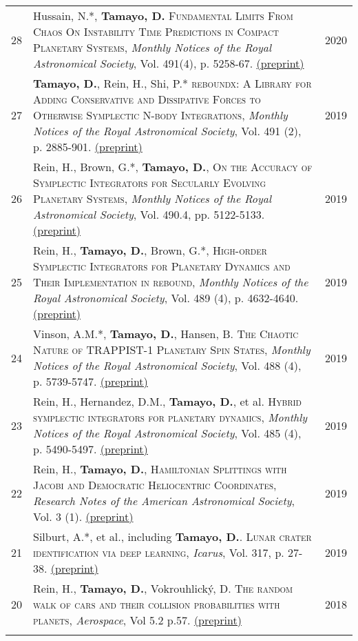 \documentclass[10pt]{article} %
\begin{document}
\begin{tabular}{>{\hfill}r|p{14.3cm}l}
28 & Hussain, N.*, {\bf Tamayo, D.} \textsc{Fundamental Limits From Chaos On Instability Time Predictions in Compact Planetary Systems}, {\it Monthly Notices of the Royal Astronomical Society}, Vol. 491(4), p. 5258-67. \href{https://www.overleaf.com/read/krtcgfjkprxz
}{(preprint)} & 2020 \\

27 & {\bf Tamayo, D.}, Rein, H., Shi, P.* \textsc{reboundx: A Library for Adding Conservative and Dissipative Forces to Otherwise Symplectic N-body Integrations}, {\it Monthly Notices of the Royal Astronomical Society}, Vol. 491 (2), p. 2885-901. \href{https://arxiv.org/abs/1908.05634}{(preprint)} & 2019 \\

26 & Rein, H., Brown, G.*, {\bf Tamayo, D.}, \textsc{On the Accuracy of Symplectic Integrators for Secularly Evolving Planetary Systems}, {\it Monthly Notices of the Royal Astronomical Society}, Vol. 490.4, pp. 5122-5133. \href{https://arxiv.org/abs/1908.03468}{(preprint)} & 2019 \\

25 & Rein, H., {\bf Tamayo, D.}, Brown, G.*, \textsc{High-order Symplectic Integrators for Planetary Dynamics and Their Implementation in rebound}, {\it Monthly Notices of the Royal Astronomical Society}, Vol. 489 (4), p. 4632-4640. \href{https://arxiv.org/abs/1907.11335}{(preprint)} & 2019 \\

24 & Vinson, A.M.*,  {\bf Tamayo, D.}, Hansen, B. \textsc{The Chaotic Nature of TRAPPIST-1 Planetary Spin States}, {\it Monthly Notices of the Royal Astronomical Society}, Vol. 488 (4), p. 5739-5747. \href{https://arxiv.org/abs/1905.11419}{(preprint)} & 2019 \\

23 & Rein, H., Hernandez, D.M., {\bf Tamayo, D.}, et al. \textsc{Hybrid symplectic integrators for planetary dynamics}, {\it Monthly Notices of the Royal Astronomical Society}, Vol. 485 (4), p. 5490-5497. \href{https://arxiv.org/abs/1903.04972}{(preprint)} & 2019 \\

22 & Rein, H., {\bf Tamayo, D.}, \textsc{Hamiltonian Splittings with Jacobi and Democratic Heliocentric Coordinates}, {\it Research Notes of the American Astronomical Society}, Vol. 3 (1). \href{https://rein.utsc.utoronto.ca/rnaas_rein_tamayo_2019.pdf}{(preprint)} & 2019 \\

21 & Silburt, A.*, et al., including {\bf Tamayo, D.}. \textsc{Lunar crater identification via deep learning}, {\it Icarus}, Vol. 317, p. 27-38. \href{https://arxiv.org/abs/1803.02192}{(preprint)} & 2019 \\

20 & Rein, H., {\bf Tamayo, D.}, Vokrouhlick\'{y}, D. \textsc{The random walk of cars and their collision probabilities with planets}, {\it Aerospace}, Vol 5.2 p.57.  \href{https://arxiv.org/abs/1802.04718}{(preprint)} & 2018 \\

\multicolumn{3}{c}{} \\

\end{tabular}
\end{document}

